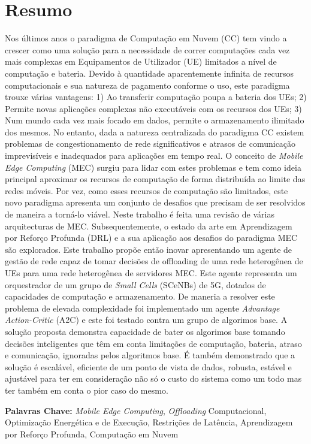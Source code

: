 \section*{Resumo}


\noindent Nos últimos anos o paradigma de Computação em Nuvem (\acrshort{CC}) tem vindo a crescer como uma solução para a necessidade de correr computações cada vez mais complexas em Equipamentos de Utilizador (\acrshort{UE}) limitados a nível de computação e bateria. Devido à quantidade aparentemente infinita de recursos computacionais e sua natureza de pagamento conforme o uso, este paradigma trouxe várias vantagens: 1) Ao transferir computação poupa a bateria dos UEs; 2) Permite novas aplicações complexas não executáveis com os recursos dos UEs; 3) Num mundo cada vez mais focado em dados, permite o armazenamento ilimitado dos mesmos. No entanto, dada a natureza centralizada do paradigma \acrshort{CC} existem problemas de congestionamento de rede significativos e atrasos de comunicação imprevisíveis e inadequados para aplicações em tempo real. O conceito de \emph{Mobile Edge Computing} (\acrshort{MEC}) surgiu para lidar com estes problemas e tem como ideia principal aproximar os recursos de computação de forma distribuída ao limite das redes móveis. Por vez, como esses recursos de computação são limitados, este novo paradigma apresenta um conjunto de desafios que precisam de ser resolvidos de maneira a torná-lo viável. Neste trabalho é feita uma revisão de várias arquitecturas de \acrshort{MEC}. Subsequentemente, o estado da arte em Aprendizagem por Reforço Profunda (\acrshort{DRL}) e a sua aplicação aos desafios do paradigma \acrshort{MEC} são explorados. Este trabalho propõe então inovar apresentando um agente de gestão de rede capaz de tomar decisões de offloading de uma rede heterogênea de UEs para uma rede heterogênea de servidores \acrshort{MEC}. Este agente representa um orquestrador de um grupo de \emph{Small Cells} (\acrshort{SCeNBs}) de 5G, dotados de capacidades de computação e armazenamento. De maneria a resolver este problema de elevada complexidade foi implementado um agente \emph{Advantage Action-Critic} (\acrshort{A2C}) e este foi testado contra um grupo de algorimos base. A solução proposta demonstra capacidade de bater os algorimos base tomando decisões inteligentes que têm em conta limitações de computação, bateria, atraso e comunicação, ignoradas pelos algoritmos base. É também demonstrado que a solução é escalável, eficiente de um ponto de vista de dados, robusta, estável e ajustável para ter em consideração não só o custo do sistema como um todo mas ter também em conta o pior caso do mesmo. 

\vfill

\textbf{\Large Palavras Chave:} \emph{Mobile Edge Computing}, \emph{Offloading} Computacional, Optimização Energética e de Execução, Restrições de Latência, Aprendizagem por Reforço Profunda, Computação em Nuvem

